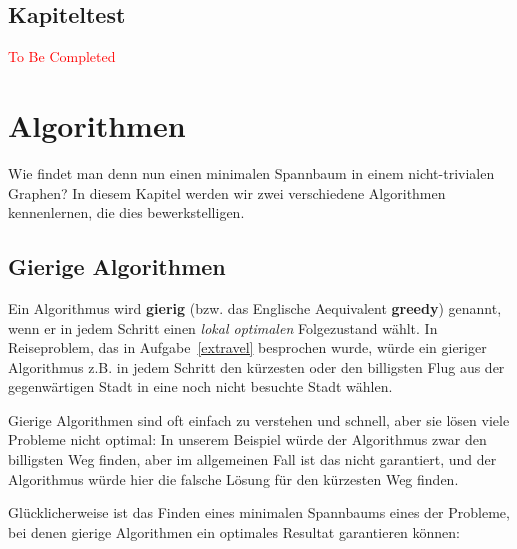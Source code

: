 \documentclass[12pt,a4paper]{report}
\theoremstyle{break}
\theoremstyle{plain}
\begin{document}
\section{Kapiteltest}
\textcolor{red}{To Be Completed}

\chapter{Algorithmen}

Wie findet man denn nun einen minimalen Spannbaum in einem
nicht-trivialen Graphen? In diesem Kapitel werden wir zwei
verschiedene Algorithmen kennenlernen, die dies bewerkstelligen.

\section{Gierige Algorithmen}

Ein Algorithmus wird \textbf{gierig} (bzw. das Englische Aequivalent
\textbf{greedy}) genannt, wenn er in jedem Schritt einen \emph{lokal
  optimalen} Folgezustand w\"{a}hlt. In Reiseproblem, das in
Aufgabe~\ref{extravel} besprochen wurde, w\"{u}rde ein gieriger
Algorithmus z.B. in jedem Schritt den k\"{u}rzesten oder den
billigsten Flug aus der gegenw\"{a}rtigen Stadt in eine noch nicht
besuchte Stadt w\"{a}hlen.

Gierige Algorithmen sind oft einfach zu verstehen und schnell, aber
sie l\"{o}sen viele Probleme nicht optimal: In unserem Beispiel
w\"{u}rde der Algorithmus zwar den billigsten Weg finden, aber im
allgemeinen Fall ist das nicht garantiert, und der Algorithmus
w\"{u}rde hier die falsche L\"{o}sung f\"{u}r den k\"{u}rzesten Weg
finden.

Gl\"{u}cklicherweise ist das Finden eines minimalen Spannbaums eines
der Probleme, bei denen gierige Algorithmen ein optimales Resultat
garantieren k\"{o}nnen:
\end{document}
